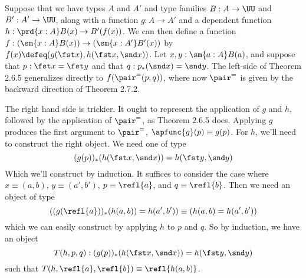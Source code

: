  \soln
Suppose that we have types $A$ and $A'$ and type families $B:A\to\UU$ and
$B':A'\to\UU$, along with a function $g:A \to A'$ and a dependent function
$h:\prd{x:A} B(x) \to B'(f(x))$.  We can then define a function $f :
(\sm{x:A}B(x)) \to (\sm{x:A'}B'(x))$ by $f(x) \defeq (g(\fst x), h(\fst x, \snd
x))$.  
Let $x, y : \sm{a:A}B(a)$, and 
suppose that $p : \fst x = \fst y$ and that $q : p_{*}(\snd x) =
\snd y$.  The left-side of Theorem 2.6.5 generalizes directly to
$f(\pair^{=}(p, q))$, where now $\pair^{=}$ is given by the backward direction
of Theorem 2.7.2.  


The right hand side is trickier.  It ought to represent the application of $g$
and $h$, followed by the application of $\pair^{=}$, as Theorem 2.6.5 does.
Applying $g$ produces the first argument to $\pair^{=}$, $\apfunc{g}(p) \equiv
g(p)$.  For $h$, we'll need to construct the right object.  We need one of type
\[
  (g(p))_{*}(h(\fst x, \snd x)) = h(\fst y, \snd y)
\]
Which we'll construct by induction.  It suffices to consider the case where $x
\equiv (a, b)$, $y \equiv (a', b')$, $p \equiv \refl{a}$, and $q \equiv
\refl{b}$.  Then we need an object of type
\[
  \left((g(\refl{a}))_{*}(h(a, b)) = h(a', b')\right)
  \equiv
  \left(h(a, b) = h(a', b')\right)
\]
which we can easily construct by applying $h$ to $p$ and $q$.  So by induction, we have an object
\[
  T(h, p, q) : 
  (g(p))_{*}(h(\fst x, \snd x)) = h(\fst y, \snd y)
\]
such that $T(h, \refl{a}, \refl{b}) \equiv \refl{h(a, b)}$.


